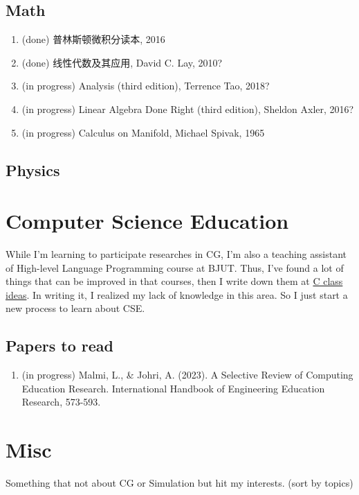 \documentclass{article}
\newcommand{\done}{
    (done)
}
\newcommand{\inprogress}{
    (in progress)
}
\begin{document}
\subsection{Math}
\begin{enumerate}
    \item \done 普林斯顿微积分读本, 2016
    \item \done 线性代数及其应用, David C. Lay, 2010?
    \item \inprogress Analysis (third edition), Terrence Tao, 2018?
    \item \inprogress Linear Algebra Done Right (third edition), Sheldon Axler, 2016?
    \item \inprogress Calculus on Manifold, Michael Spivak, 1965
\end{enumerate}
\subsection{Physics}

\section{Computer Science Education}
\par While I'm learning to participate researches in CG, I'm also a teaching assistant of High-level Language Programming course at BJUT. Thus, I've found a lot of things that can be improved in that courses, then I write down them at \href{http://hlxy-420.github.io/c-class-ideas}{C class ideas}. In writing it, I realized my lack of knowledge in this area. So I just start a new process to learn about CSE.

\subsection{Papers to read}
\begin{enumerate}
    \item \inprogress Malmi, L., \& Johri, A. (2023). A Selective Review of Computing Education Research. International Handbook of Engineering Education Research, 573-593.
\end{enumerate}

\section{Misc}
\par Something that not about CG or Simulation but hit my interests. (sort by topics)
\end{document}
